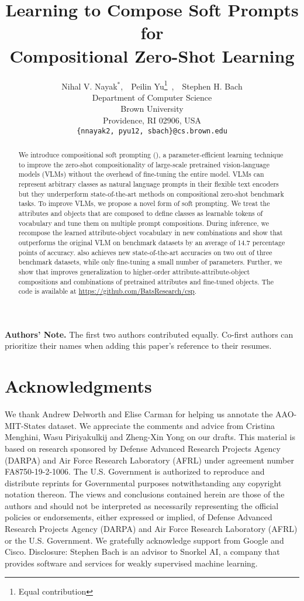 \documentclass{article}
\title{Learning to Compose Soft Prompts for\\ Compositional Zero-Shot Learning}
\author{Nihal V. Nayak$^{*}$,\ \ Peilin Yu\thanks{Equal contribution}\ ,\ \  Stephen H. Bach\\
Department of Computer Science\\
Brown University\\
Providence, RI 02906, USA \\
\texttt{\{nnayak2, pyu12, sbach\}@cs.brown.edu} \\
}
\begin{document}
\maketitle
\begin{abstract}
We introduce compositional soft prompting (\cspnamenospace), a parameter-efficient learning technique to improve the zero-shot compositionality of large-scale pretrained vision-language models (VLMs) without the overhead of fine-tuning the entire model.
VLMs can represent arbitrary classes as natural language prompts in their flexible text encoders but they underperform state-of-the-art methods on compositional zero-shot benchmark tasks.
To improve VLMs, we propose a novel form of soft prompting.
We treat the attributes and objects that are composed to define classes as learnable tokens of vocabulary and tune them on multiple prompt compositions.
During inference, we recompose the learned attribute-object vocabulary in new combinations and show that \cspname outperforms the original VLM on benchmark datasets by an average of 14.7 percentage points of accuracy.
\cspname also achieves new state-of-the-art accuracies on two out of three benchmark datasets, while only fine-tuning a small number of parameters.
Further, we show that \cspname improves generalization to higher-order attribute-attribute-object compositions and combinations of pretrained attributes and fine-tuned objects.
The code is available at \href{https://github.com/BatsResearch/csp}{https://github.com/BatsResearch/csp}.
\end{abstract}










\textbf{Authors’ Note.} The first two authors contributed equally. 
Co-first authors can prioritize their names when adding this paper’s reference to their resumes.


\section*{Acknowledgments}
We thank Andrew Delworth and Elise Carman for helping us annotate the AAO-MIT-States dataset.
We appreciate the comments and advice from Cristina Menghini, Wasu Piriyakulkij and  Zheng-Xin Yong on our drafts. 
This material is based on research sponsored by Defense Advanced Research Projects Agency (DARPA)
and Air Force Research Laboratory (AFRL) under
agreement number FA8750-19-2-1006. The U.S. Government is authorized to reproduce and distribute
reprints for Governmental purposes notwithstanding
any copyright notation thereon. The views and conclusions contained herein are those of the authors and
should not be interpreted as necessarily representing
the official policies or endorsements, either expressed or implied, of Defense Advanced Research Projects Agency (DARPA) and Air Force Research Laboratory
(AFRL) or the U.S. Government. We gratefully acknowledge support from Google and Cisco. Disclosure:
Stephen Bach is an advisor to Snorkel AI, a company that provides software and services for weakly supervised machine learning.




\clearpage
\appendix

\end{document}
